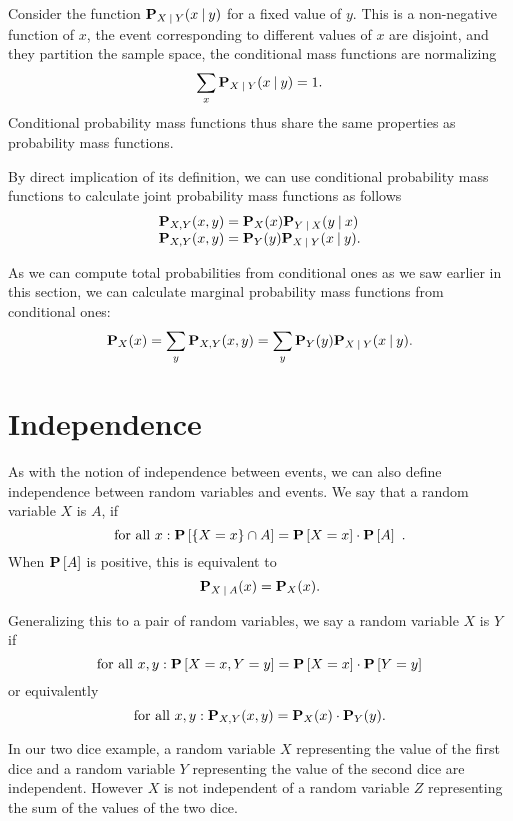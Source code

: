 \begin{gram}
Consider the function $\mathbf{P}_{X {\:\mid\:} Y}(x {\:\mid\:} y)$ for a fixed value
of $y$.  This is a non-negative function of $x$, the event
corresponding to different values of $x$ are disjoint, and they
partition the sample space, the conditional mass functions are
normalizing
\[
\sum_{x}{\mathbf{P}_{X {\:\mid\:} Y}(x {\:\mid\:} y)} = 1. 
\]
Conditional probability mass functions thus share the same properties
as probability mass functions.

By direct implication of its definition, we can use conditional
probability mass functions to calculate joint probability mass
functions as follows
\[
\begin{array}{lll}
\mathbf{P}_{X,Y}(x,y) = \mathbf{P}_{X}(x) \mathbf{P}_{Y {\:\mid\:} X}(y {\:\mid\:} x)
\\
\mathbf{P}_{X,Y}(x,y) = \mathbf{P}_{Y}(y) \mathbf{P}_{X {\:\mid\:} Y}(x {\:\mid\:} y).
\end{array}
\]
%

As we can compute total probabilities from conditional ones as we saw
earlier in this section, we can calculate marginal probability
mass functions from conditional ones:
\[
\mathbf{P}_{X}(x) = \sum_{y}{\mathbf{P}_{X,Y}(x,y)} = \sum_{y}{\mathbf{P}_{Y}(y)\mathbf{P}_{X {\:\mid\:} Y}(x {\:\mid\:} y)}.
\]
\end{gram}



\section{Independence}
\label{sec:probability::randvar::independence}

\begin{gram}
As with the notion of independence between events, we can also define
independence between random variables and events.
%
We say that a random variable $X$ is 
$A$, if 
\[
\mbox{for all}~x: \mathbf{P}\left[{\{X =x\} \cap A}\right] = \mathbf{P}\left[{X = x}\right] \cdot \mathbf{P}\left[{A}\right]~.
\] 
%
When $\mathbf{P}\left[{A}\right]$ is positive, this is equivalent to 
\[
\mathbf{P}_{X {\:\mid\:} A} (x) = \mathbf{P}_{X}(x).
\]

Generalizing this to a pair of random variables, we say a random variable
$X$ is  $Y$ if 
\[
\mbox{for all}~x, y: \mathbf{P}\left[{X = x, Y = y}\right] = \mathbf{P}\left[{X = x}\right] \cdot \mathbf{P}\left[{Y = y}\right]
\]
%
or equivalently
\[
\mbox{for all}~x, y: \mathbf{P}_{X,Y}(x,y) = \mathbf{P}_{X}(x) \cdot \mathbf{P}_{Y}(y).
\]

In our two dice
example, a random variable $X$ representing the value of the first
dice and a random variable $Y$ representing the value of the second
dice are independent. 
%
However $X$ is not independent of a random variable $Z$ representing
the sum of the values of the two dice.
\end{gram}


